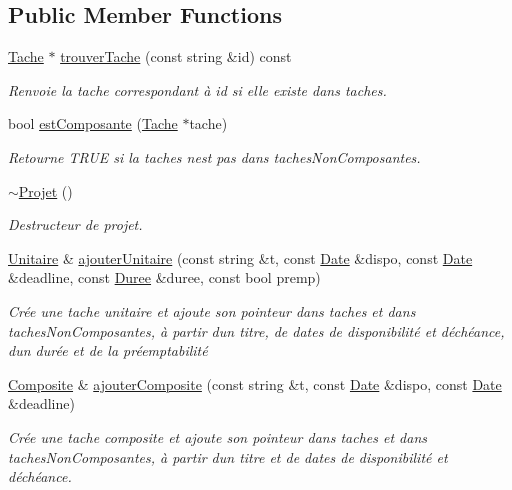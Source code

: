 \subsection*{Public Member Functions}
\begin{DoxyCompactItemize}
\item 
\hyperlink{class_tache}{Tache} $\ast$ \hyperlink{class_projet_a386c53fc44bad454440d7742c4a705dd}{trouver\+Tache} (const string \&id) const 
\begin{DoxyCompactList}\small\item\em Renvoie la tache correspondant à id si elle existe dans taches. \end{DoxyCompactList}\item 
bool \hyperlink{class_projet_abbd43f9e454767870aeb2e5ae87b7cfe}{est\+Composante} (\hyperlink{class_tache}{Tache} $\ast$tache)
\begin{DoxyCompactList}\small\item\em Retourne T\+R\+U\+E si la taches n\textquotesingle{}est pas dans taches\+Non\+Composantes. \end{DoxyCompactList}\item 
\hyperlink{class_projet_a26e3e136385eca01dda79df7fba4e03d}{$\sim$\+Projet} ()
\begin{DoxyCompactList}\small\item\em Destructeur de projet. \end{DoxyCompactList}\item 
\hyperlink{class_unitaire}{Unitaire} \& \hyperlink{class_projet_ab55ad105de7afee7d7ce66f7cfcc871d}{ajouter\+Unitaire} (const string \&t, const \hyperlink{class_t_i_m_e_1_1_date}{Date} \&dispo, const \hyperlink{class_t_i_m_e_1_1_date}{Date} \&deadline, const \hyperlink{class_t_i_m_e_1_1_duree}{Duree} \&duree, const bool premp)
\begin{DoxyCompactList}\small\item\em Crée une tache unitaire et ajoute son pointeur dans taches et dans taches\+Non\+Composantes, à partir d\textquotesingle{}un titre, de dates de disponibilité et d\textquotesingle{}échéance, d\textquotesingle{}un durée et de la préemptabilité \end{DoxyCompactList}\item 
\hyperlink{class_composite}{Composite} \& \hyperlink{class_projet_a3b4d1f44967fec94cd9523164b46a4bb}{ajouter\+Composite} (const string \&t, const \hyperlink{class_t_i_m_e_1_1_date}{Date} \&dispo, const \hyperlink{class_t_i_m_e_1_1_date}{Date} \&deadline)
\begin{DoxyCompactList}\small\item\em Crée une tache composite et ajoute son pointeur dans taches et dans taches\+Non\+Composantes, à partir d\textquotesingle{}un titre et de dates de disponibilité et d\textquotesingle{}échéance. \end{DoxyCompactList}\item 

\end{DoxyCompactItemize}
